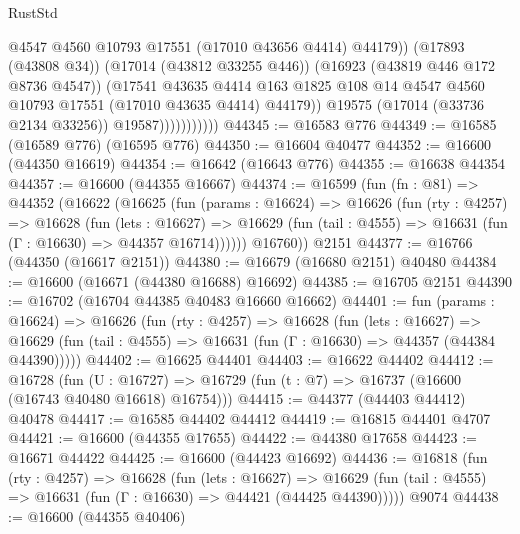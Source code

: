 \begin{lexlean}{RustStd}
\begin{coremodule}
{\begin{coremodule}
{{{{{{{{{{{{{{{{{{{{{{{{{{{{{{{{{{{{{{{{{{{{{{{{{{{{{{{                                @4547
                                @4560
                                @10793
                                @17551
                                (@17010 @43656 @4414)
                                @44179))
                            (@17893 (@43808 @34))
                            (@17014 (@43812 @33255 @446))
                            (@16923 (@43819 @446 @172 @8736 @4547))
                            (@17541
                              @43635
                              @4414
                              @163
                              @1825
                              @108
                              @14
                              @4547
                              @4560
                              @10793
                              @17551
                              (@17010 @43635 @4414)
                              @44179))
                          @19575
                          (@17014 (@33736 @2134 @33256))
                          @19587)))))))))))
@44345 := @16583 @776
@44349 := @16585 (@16589 @776) (@16595 @776)
@44350 := @16604 @40477
@44352 := @16600 (@44350 @16619)
@44354 := @16642 (@16643 @776)
@44355 := @16638 @44354
@44357 := @16600 (@44355 @16667)
@44374 := @16599
    (fun (fn : @81) =>
    @44352
      (@16622
        (@16625
          (fun (params : @16624) =>
          @16626
            (fun (rty : @4257) =>
            @16628
              (fun (lets : @16627) =>
              @16629 (fun (tail : @4555) => @16631 (fun (Γ : @16630) => @44357 @16714))))))
        @16760))
    @2151
@44377 := @16766 (@44350 (@16617 @2151))
@44380 := @16679 (@16680 @2151) @40480
@44384 := @16600 (@16671 (@44380 @16688) @16692)
@44385 := @16705 @2151
@44390 := @16702 (@16704 @44385 @40483 @16660 @16662)
@44401 := fun (params : @16624) =>
  @16626
    (fun (rty : @4257) =>
    @16628
      (fun (lets : @16627) =>
      @16629 (fun (tail : @4555) => @16631 (fun (Γ : @16630) => @44357 (@44384 @44390)))))
@44402 := @16625 @44401
@44403 := @16622 @44402
@44412 := @16728
    (fun (U : @16727) => @16729 (fun (t : @7) => @16737 (@16600 (@16743 @40480 @16618) @16754)))
@44415 := @44377 (@44403 @44412) @40478
@44417 := @16585 @44402 @44412
@44419 := @16815 @44401 @4707
@44421 := @16600 (@44355 @17655)
@44422 := @44380 @17658
@44423 := @16671 @44422
@44425 := @16600 (@44423 @16692)
@44436 := @16818
    (fun (rty : @4257) =>
    @16628
      (fun (lets : @16627) =>
      @16629 (fun (tail : @4555) => @16631 (fun (Γ : @16630) => @44421 (@44425 @44390)))))
    @9074
@44438 := @16600 (@44355 @40406)
}}}}}}}}}}}}}}}}}}}}}}}}}}}}}}}}}}}}}}}}}}}}}}}}}}}}}}}
\end{coremodule}}
\end{coremodule}
\end{lexlean}

